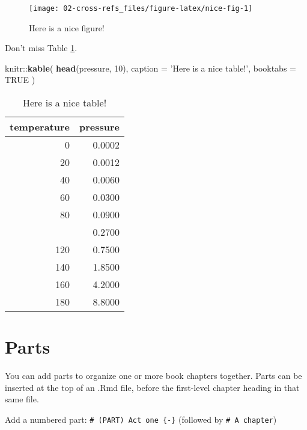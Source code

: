 \documentclass[]{book}
\newenvironment{Shaded}{\begin{snugshade}}{\end{snugshade}}
\newcommand{\KeywordTok}[1]{\textcolor[rgb]{0.13,0.29,0.53}{\textbf{{#1}}}}
\newcommand{\DataTypeTok}[1]{\textcolor[rgb]{0.13,0.29,0.53}{{#1}}}
\newcommand{\DecValTok}[1]{\textcolor[rgb]{0.00,0.00,0.81}{{#1}}}
\newcommand{\StringTok}[1]{\textcolor[rgb]{0.31,0.60,0.02}{{#1}}}
\newcommand{\OtherTok}[1]{\textcolor[rgb]{0.56,0.35,0.01}{{#1}}}
\newcommand{\NormalTok}[1]{{#1}}
\begin{document}
\begin{figure}

{\centering \texttt{[image: 02-cross-refs\_files/figure-latex/nice-fig-1]} 

}

\caption{Here is a nice figure!}\label{fig:nice-fig}
\end{figure}

Don't miss Table \ref{tab:nice-tab}.

\begin{Shaded}
\begin{Highlighting}[]
\NormalTok{knitr::}\KeywordTok{kable}\NormalTok{(}
  \KeywordTok{head}\NormalTok{(pressure, }\DecValTok{10}\NormalTok{), }\DataTypeTok{caption =} \StringTok{'Here is a nice table!'}\NormalTok{,}
  \DataTypeTok{booktabs =} \OtherTok{TRUE}
\NormalTok{)}
\end{Highlighting}
\end{Shaded}

\begin{table}

\caption{\label{tab:nice-tab}Here is a nice table!}
\centering
\begin{tabular}[t]{rr}
\toprule
temperature & pressure\\
\midrule
0 & 0.0002\\
20 & 0.0012\\
40 & 0.0060\\
60 & 0.0300\\
80 & 0.0900\\
\addlinespace
100 & 0.2700\\
120 & 0.7500\\
140 & 1.8500\\
160 & 4.2000\\
180 & 8.8000\\
\bottomrule
\end{tabular}
\end{table}

\chapter{Parts}\label{parts}

You can add parts to organize one or more book chapters together. Parts
can be inserted at the top of an .Rmd file, before the first-level
chapter heading in that same file.

Add a numbered part: \texttt{\#\ (PART)\ Act\ one\ \{-\}} (followed by
\texttt{\#\ A\ chapter})
\end{document}
